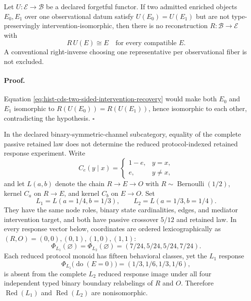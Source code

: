 Let \(U:\mathcal E\to\mathcal B\) be a declared forgetful functor.  If two
admitted enriched objects \(E_0,E_1\) over one observational datum satisfy
\(U(E_0)=U(E_1)\) but are not type-preservingly intervention-isomorphic, then
there is no reconstruction \(R:\mathcal B\to\mathcal E\) with
\begin{equation}
R\,U(E)\cong E
\quad\text{for every compatible }E.
\label{eq:hist-cds-two-sided-intervention-recovery}
\end{equation}
A conventional right-inverse choosing one representative per observational
fiber is not excluded.  

\paragraph{Proof.}
Equation \eqref{eq:hist-cds-two-sided-intervention-recovery} would make both
\(E_0\) and \(E_1\) isomorphic to \(R(U(E_0))=R(U(E_1))\), hence isomorphic
to each other, contradicting the hypothesis.  \(\square\)

In the declared binary-symmetric-channel subcategory, equality of the
complete passive retained law does not determine the reduced
protocol-indexed retained response experiment.  Write
\begin{equation}
C_e(y\mid x)=
\begin{cases}
1-e,&y=x,\\
e,&y\ne x,
\end{cases}
\label{eq:hist-intervention-bsc-kernel}
\end{equation}
and let \(L(a,b)\) denote the chain \(R\to E\to O\) with
\(R\sim\operatorname{Bernoulli}(1/2)\), kernel \(C_a\) on
\(R\to E\), and kernel \(C_b\) on \(E\to O\).  Set
\begin{equation}
L_1=L(a=1/4,b=1/3),
\qquad
L_2=L(a=1/3,b=1/4).
\label{eq:hist-intervention-same-signature-laws}
\end{equation}
They have the same node roles, binary state cardinalities, edges, and
mediator intervention target, and both have passive crossover \(5/12\) and
retained law.  In every response vector below, coordinates are ordered
lexicographically as \((R,O)=(0,0),(0,1),(1,0),(1,1)\):
\begin{equation}
\Phi_{L_1}(\varnothing)=\Phi_{L_2}(\varnothing)
=(7/24,5/24,5/24,7/24).
\label{eq:hist-intervention-passive-law}
\end{equation}
Each reduced protocol monoid has fifteen behavioral classes, yet the
\(L_1\) response
\begin{equation}
\Phi_{L_1}\bigl(\operatorname{do}(E=0)\bigr)
=(1/3,1/6,1/3,1/6),
\label{eq:hist-intervention-unmatched-response}
\end{equation}
is absent from the complete \(L_2\) reduced response image under all four
independent typed binary boundary relabelings of \(R\) and \(O\).
Therefore \(\operatorname{Red}(L_1)\) and
\(\operatorname{Red}(L_2)\) are nonisomorphic.  

